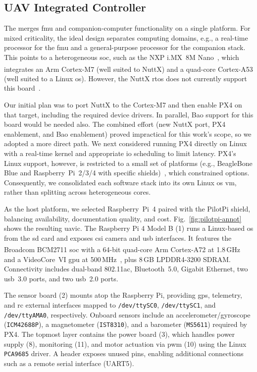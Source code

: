 \subsection{UAV Integrated Controller}
\label{sec:uav-integr-contr}
The  merges \gls{fmu} and companion-computer functionality on
a single platform. For mixed criticality, the ideal design separates computing
domains, e.g., a real-time processor for the \gls{fmu} and a general-purpose
processor for the companion stack. This points to a heterogeneous \gls{soc},
such as the NXP i.MX~8M Nano~\cite{imx8mn}, which integrates an Arm\textsuperscript{\textregistered}
Cortex\textsuperscript{\textregistered}-M7 (well suited to NuttX) and a quad-core
Cortex\textsuperscript{\textregistered}-A53 (well suited to a Linux \gls{os}). However, the NuttX \gls{rtos}
does not currently support this board~\cite{nuttx-platforms}.

Our initial plan was to port NuttX to the Cortex-M7 and then enable PX4 on that
target, including the required device drivers. In parallel, Bao support for this
board would be needed also. The combined effort (new NuttX port, PX4 enablement,
and Bao enablement) proved impractical for this work’s scope, so we adopted a
more direct path.
%
We next considered running PX4 directly on Linux with a real-time kernel and
appropriate \gls{io} scheduling to limit latency. PX4’s Linux support, however,
is restricted to a small set of platforms (e.g., BeagleBone Blue and
Raspberry~Pi~2/3/4 with specific shields)~\cite{px4-experimental-autopilot},
which constrained options. Consequently, we consolidated each software stack
into its own Linux \gls{os} \gls{vm}, rather than splitting across heterogeneous cores.

As the host platform, we selected Raspberry~Pi~4 paired with the PilotPi shield,
balancing availability, documentation quality, and cost. Fig.~\ref{fig:pilotpi-annot}
shows the resulting \gls{uavic}. The Raspberry Pi 4 Model B (1) runs a Linux-based
\gls{os} from the \gls{sd} card and exposes \gls{csi} camera and \gls{usb}
interfaces. It features the Broadcom BCM2711 \gls{soc} with a 64-bit quad-core
Arm\textsuperscript{\textregistered} Cortex\textsuperscript{\textregistered}-A72 at 1.8\,GHz and a
VideoCore~VI \gls{gpu} at 500\,MHz~\cite{rpi4-specs,rpi4-bcm2711}, plus 8\,GB
LPDDR4-3200 SDRAM. Connectivity includes dual-band 802.11ac, Bluetooth~5.0,
Gigabit Ethernet, two \gls{usb}~3.0 ports, and two \gls{usb}~2.0 ports.

The sensor board (2) mounts atop the Raspberry Pi, providing \gls{gps}, telemetry,
and \gls{rc} external interfaces mapped to \lstinline{/dev/ttySC0}, \lstinline{/dev/ttySC1},
and \lstinline{/dev/ttyAMA0}, respectively. Onboard sensors include an accelerometer/gyroscope
(\lstinline{ICM42688P}), a magnetometer (\lstinline{IST8310}), and a barometer
(\lstinline{MS5611}) required by PX4.
%
The topmost layer contains the power board (3), which handles power supply (8),
monitoring (11), and motor actuation via \gls{pwm} (10) using the Linux
\lstinline{PCA9685} driver. A header exposes unused pins, enabling additional
connections such as a remote serial interface (UART5).

